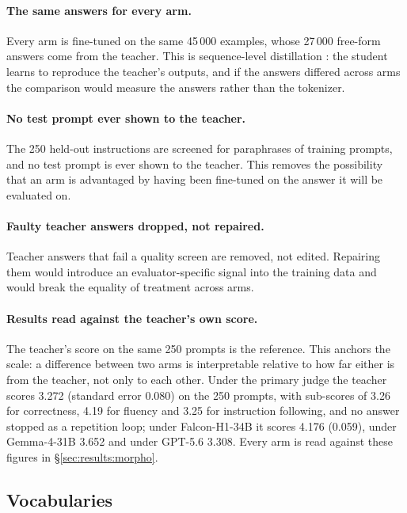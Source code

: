 \documentclass[a4paper,fleqn]{cas-sc}
\begin{document}
\paragraph{The same answers for every arm.} Every arm is fine-tuned on the same 45\,000 examples, whose 27\,000 free-form answers come from the teacher. This is sequence-level distillation \citep{kim2016sequence}: the student learns to reproduce the teacher's outputs, and if the answers differed across arms the comparison would measure the answers rather than the tokenizer.

\paragraph{No test prompt ever shown to the teacher.} The 250 held-out instructions are screened for paraphrases of training prompts, and no test prompt is ever shown to the teacher. This removes the possibility that an arm is advantaged by having been fine-tuned on the answer it will be evaluated on.

\paragraph{Faulty teacher answers dropped, not repaired.} Teacher answers that fail a quality screen are removed, not edited. Repairing them would introduce an evaluator-specific signal into the training data and would break the equality of treatment across arms.

\paragraph{Results read against the teacher's own score.}
The teacher's score on the same 250 prompts is the reference. This anchors the scale: a difference between two arms is interpretable relative to how far either is from the teacher, not only to each other.
Under the primary judge the teacher scores 3.272 (standard error 0.080) on the 250 prompts, with sub-scores of 3.26 for correctness, 4.19 for fluency and 3.25 for instruction following, and no answer stopped as a repetition loop; under Falcon-H1-34B it scores 4.176 (0.059), under Gemma-4-31B 3.652 and under GPT-5.6 3.308. Every arm is read against these figures in \S\ref{sec:results:morpho}.

\subsection{Vocabularies}
\label{sec:protocol:vocab}
\end{document}
